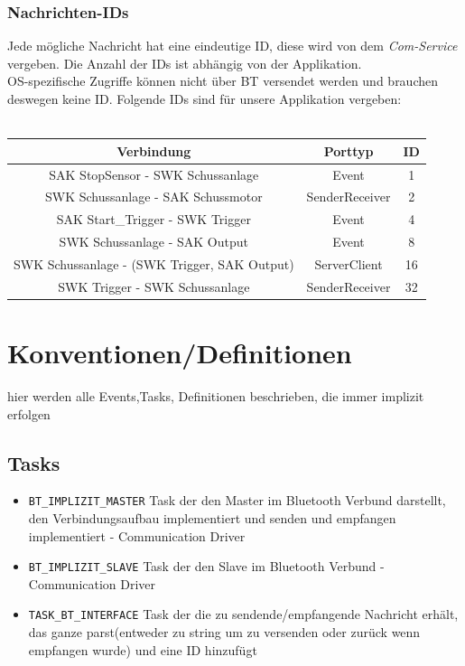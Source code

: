 \documentclass[a4paper,11pt]{scrreprt}
\begin{document}
\subsection{Nachrichten-IDs}
Jede mögliche Nachricht hat eine eindeutige ID, diese wird von dem \textit{Com-Service} vergeben. Die Anzahl der IDs ist abhängig von der Applikation.\\ OS-spezifische Zugriffe können nicht über BT versendet werden und brauchen deswegen keine ID.
Folgende IDs sind für unsere Applikation vergeben:\\~\\
\centering
	\begin{tabular}{|c|c|c|}
	\hline
	\textbf{Verbindung} & \textbf{Porttyp} & \textbf{ID}\\
	\hline
	SAK StopSensor - SWK Schussanlage & Event & 1\\
	SWK Schussanlage - SAK Schussmotor & SenderReceiver & 2\\
	SAK Start\_Trigger - SWK Trigger & Event & 4\\
	SWK Schussanlage - SAK Output & Event & 8\\
	SWK Schussanlage - (SWK Trigger, SAK Output) & ServerClient & 16\\
	SWK Trigger - SWK Schussanlage & SenderReceiver & 32\\
	\hline
	\end{tabular}

\chapter{Konventionen/Definitionen}
hier werden alle Events,Tasks, Definitionen beschrieben, die immer implizit erfolgen
\section{Tasks}
\begin{itemize}
\item \lstinline|BT_IMPLIZIT_MASTER| Task der den Master im Bluetooth Verbund darstellt, den Verbindungsaufbau implementiert und senden und empfangen implementiert - Communication Driver
\item \lstinline|BT_IMPLIZIT_SLAVE| Task der den Slave im Bluetooth Verbund - Communication Driver
\item \lstinline|TASK_BT_INTERFACE| Task der die zu sendende/empfangende Nachricht erhält, das ganze parst(entweder zu string um zu versenden oder zurück wenn empfangen wurde) und eine ID hinzufügt
\end{itemize}
\end{document}
